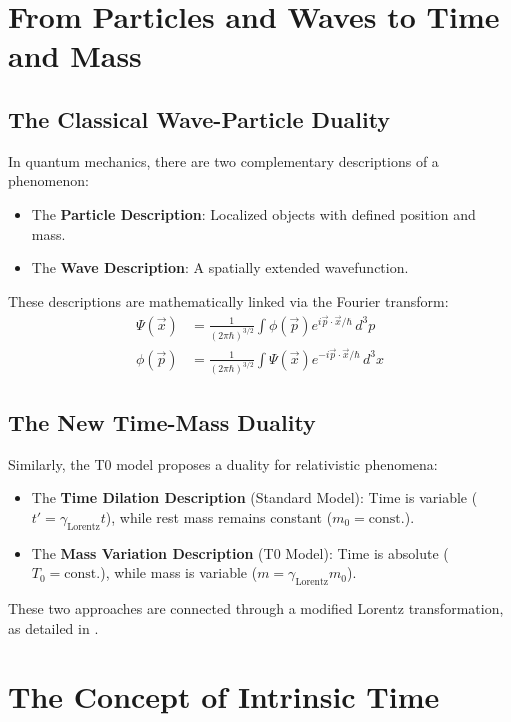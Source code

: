 \documentclass[a4paper,12pt]{article}
\newcommand{\Tzero}{T_0}
\newcommand{\vecx}{\vec{x}}
\newcommand{\gammaf}{\gamma_{\text{Lorentz}}}
\begin{document}
	\section{From Particles and Waves to Time and Mass}
	
	\subsection{The Classical Wave-Particle Duality}
	
	In quantum mechanics, there are two complementary descriptions of a phenomenon:
	\begin{itemize}
		\item The \textbf{Particle Description}: Localized objects with defined position and mass.
		\item The \textbf{Wave Description}: A spatially extended wavefunction.
	\end{itemize}
	
	These descriptions are mathematically linked via the Fourier transform:
	\begin{align}
		\Psi(\vecx) &= \frac{1}{(2\pi\hbar)^{3/2}} \int \phi(\vec{p}) e^{i\vec{p}\cdot\vecx/\hbar} \, d^3p \\
		\phi(\vec{p}) &= \frac{1}{(2\pi\hbar)^{3/2}} \int \Psi(\vecx) e^{-i\vec{p}\cdot\vecx/\hbar} \, d^3x
	\end{align}
	
	\subsection{The New Time-Mass Duality}
	
	Similarly, the T0 model proposes a duality for relativistic phenomena:
	\begin{itemize}
		\item The \textbf{Time Dilation Description} (Standard Model): Time is variable (\( t' = \gammaf t \)), while rest mass remains constant (\( m_0 = \text{const.} \)).
		\item The \textbf{Mass Variation Description} (T0 Model): Time is absolute (\( \Tzero = \text{const.} \)), while mass is variable (\( m = \gammaf m_0 \)).
	\end{itemize}
	
	These two approaches are connected through a modified Lorentz transformation, as detailed in \cite{pascher_params_2025}.
	
	\section{The Concept of Intrinsic Time}
	
\end{document}
